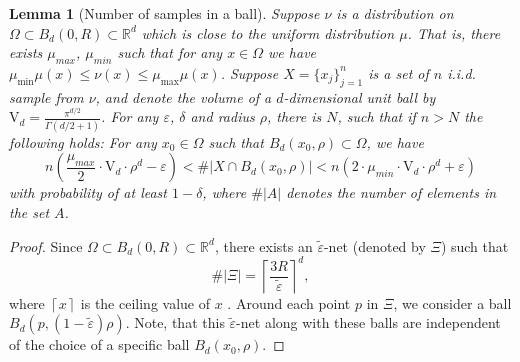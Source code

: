 \documentclass[12pt]{article}
\newtheorem{Lemma}[Theorem]{Lemma}
\theoremstyle{remark}
\newcommand{\RR}{\mathbb{R}}
\newcommand{\eps}{\varepsilon}
\newcommand{\ceil}[1]{\left\lceil #1 \right\rceil}
\newcommand{\abs}[1]{\left\vert #1 \right\vert}
\begin{document}
\begin{appendices}
\begin{Lemma}[Number of samples in a ball]\label{lem:sampling_density_almost_uniform_clean}
Suppose $\nu$ is a distribution on $\Omega\subset B_d(0,R) \subset \RR^d$ which is close to the uniform distribution $\mu$. That is, there exists $\mu_{max}$, $\mu_{min}$  such that for any $x\in \Omega$ we have  $\mu_{\min}\mu(x) \leq \nu(x) \leq \mu_{\max}\mu(x)$. Suppose $X=\{x_j\}_{j=1}^n$ is a set of $n$ i.i.d. sample from $\nu$, and denote the volume of a $ d $-dimensional unit ball by  $ \mathrm{V}_d = \frac{\pi^{d/2}}{\Gamma(d/2+1)} $. For any $\eps$, $\delta$ and radius $\rho$, there is $N$, such that if $n>N$ the following holds: For any $x_0\in \Omega$ such that $B_d(x_0,\rho)\subset \Omega$, we have 
\[
n(\frac{\mu_{max}}{2}\cdot \mathrm{V}_d \cdot\rho^d-\eps) < \#|X \cap B_d(x_0, \rho)| < n(2\cdot \mu_{min}\cdot \mathrm{V}_d \cdot\rho^d+\eps)
\]
with probability of at least $1-\delta$, where $\#|A|$ denotes the number of elements in the set $A$.
\end{Lemma}
\begin{proof}
Since $\Omega \subset B_d(0,R)\subset\RR^d$, there exists an $\tilde\eps$-net (denoted by $\Xi$) such that 
\[
\#\abs{\Xi} = \ceil{ \frac{3R}{\tilde\eps}}^d
,\]
where $ \ceil{x} $ is the ceiling value of $ x $ \cite{vershynin2018high}.
Around each point $p$ in $\Xi$, we consider a ball $B_d(p, (1 - \tilde\eps)\rho)$. 
Note, that this $\tilde\eps$-net along with these balls are independent of the choice of a specific ball $B_d(x_0,\rho)$.


\end{proof}
\end{appendices}
\end{document}
